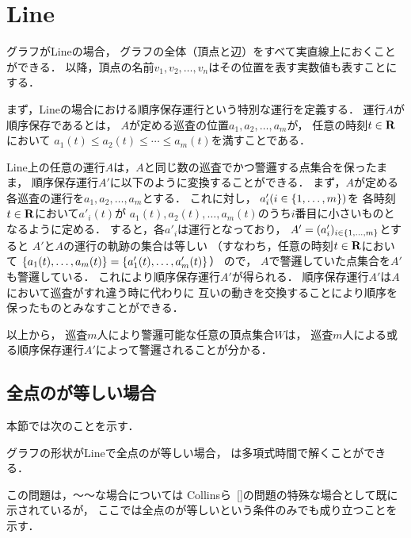 \section{Line}
\label{section: line}

グラフがLineの場合，
グラフの全体（頂点と辺）をすべて実直線上におくことができる．
以降，頂点の名前$v_1, v_2, \ldots, v_n$はその位置を表す実数値も表すことにする．

まず，Lineの場合における順序保存運行という特別な運行を定義する．
運行$A$が順序保存であるとは，
$A$が定める巡査の位置$a_1, a_2, \ldots, a_m$が，
任意の時刻$t \in \mathbf R$において
$a_1(t) \leq a_2(t) \leq \cdots \leq a_m(t)$を満すことである．

Line上の任意の運行$A$は，$A$と同じ数の巡査でかつ警邏する点集合を保ったまま，
順序保存運行$A'$に以下のように変換することができる．
%
まず，$A$が定める各巡査の運行を$a_1, a_2, \ldots, a_m$とする．
これに対し，
$a'_i (i \in \left\{{1, \ldots, m}\right\})$を
各時刻$t \in \mathbf R$において$a' _i(t)$が
$a_1(t), a_2(t), \ldots, a_m(t)$のうち$i$番目に小さいものとなるように定める．
すると，各$a' _i$は運行となっており，
$A' = (a' _i)_{ i \in \left\{{1,\ldots, m}\right\} }$とすると
$A'$と$A$の運行の軌跡の集合は等しい
（すなわち，任意の時刻$t \in \mathbf R$において
$\left\{{a_1(t), \ldots, a_m(t)}\right\} = \left\{{a'_1(t), \ldots, a'_m(t)}\right\}$）
ので，
$A$で警邏していた点集合を$A'$も警邏している．
これにより順序保存運行$A'$が得られる．
%
順序保存運行$A'$は$A$において巡査がすれ違う時に代わりに
互いの動きを交換することにより順序を保ったものとみなすことができる．

以上から，
巡査$m$人により警邏可能な任意の頂点集合$W$は，
巡査$m$人による或る順序保存運行$A'$によって警邏されることが分かる．





\subsection{全点の{\idletime}が等しい場合}
\label{subsec:LineUnaryTimelimit}




本節では次のことを示す．

\begin{theo}
  \label{theo:LineEqualTimelimit}
  グラフの形状がLineで全点の{\idletime}が等しい場合，
  {\patProb}は多項式時間で解くことができる．
\end{theo}

この問題は，～～な場合については Collinsら~\ref{}の問題の特殊な場合として既に示されているが，
ここでは全点の{\idletime}が等しいという条件のみでも成り立つことを示す．


